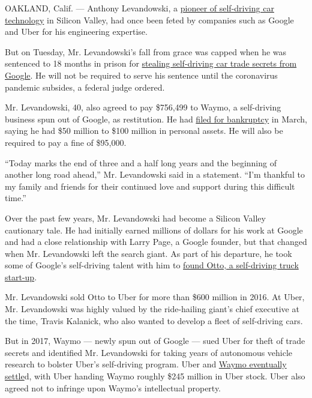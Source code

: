 OAKLAND, Calif. --- Anthony Levandowski, a
\href{https://www.nytimes.com/2016/05/17/technology/want-to-buy-a-self-driving-car-trucks-may-come-first.html}{pioneer
of self-driving car technology} in Silicon Valley, had once been feted
by companies such as Google and Uber for his engineering expertise.

But on Tuesday, Mr. Levandowski's fall from grace was capped when he was
sentenced to 18 months in prison for
\href{https://www.nytimes.com/2020/03/19/technology/levandowski-uber-google-plea.html}{stealing
self-driving car trade secrets from Google}. He will not be required to
serve his sentence until the coronavirus pandemic subsides, a federal
judge ordered.

Mr. Levandowski, 40, also agreed to pay \$756,499 to Waymo, a
self-driving business spun out of Google, as restitution. He had
\href{https://www.nytimes.com/2020/03/04/technology/anthony-levandowski-google-uber.html}{filed
for bankruptcy} in March, saying he had \$50 million to \$100 million in
personal assets. He will also be required to pay a fine of \$95,000.

``Today marks the end of three and a half long years and the beginning
of another long road ahead,'' Mr. Levandowski said in a statement. ``I'm
thankful to my family and friends for their continued love and support
during this difficult time.''

Over the past few years, Mr. Levandowski had become a Silicon Valley
cautionary tale. He had initially earned millions of dollars for his
work at Google and had a close relationship with Larry Page, a Google
founder, but that changed when Mr. Levandowski left the search giant. As
part of his departure, he took some of Google's self-driving talent with
him to
\href{https://www.nytimes.com/2016/05/17/technology/want-to-buy-a-self-driving-car-trucks-may-come-first.html}{found
Otto, a self-driving truck start-up}.

Mr. Levandowski sold Otto to Uber for more than \$600 million in 2016.
At Uber, Mr. Levandowski was highly valued by the ride-hailing giant's
chief executive at the time, Travis Kalanick, who also wanted to develop
a fleet of self-driving cars.

But in 2017, Waymo --- newly spun out of Google --- sued Uber for theft
of trade secrets and identified Mr. Levandowski for taking years of
autonomous vehicle research to bolster Uber's self-driving program. Uber
and
\href{https://www.nytimes.com/2018/02/09/technology/uber-waymo-lawsuit-driverless.html}{Waymo
eventually settle}d, with Uber handing Waymo roughly \$245 million in
Uber stock. Uber also agreed not to infringe upon Waymo's intellectual
property.

